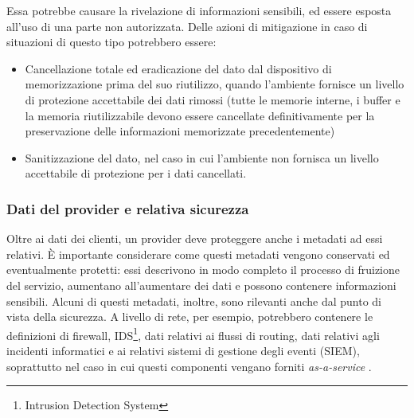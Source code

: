 \documentclass[../main.tex]{subfiles}
\begin{document}
Essa potrebbe causare la rivelazione di informazioni sensibili, ed essere esposta all'uso di una parte non autorizzata.
Delle azioni di mitigazione in caso di situazioni di questo tipo potrebbero essere:
\begin{itemize}
\item Cancellazione totale ed eradicazione del dato dal dispositivo di memorizzazione prima del suo riutilizzo, quando l'ambiente fornisce un livello di protezione accettabile dei dati rimossi (tutte le memorie interne, i buffer e la memoria riutilizzabile devono essere cancellate definitivamente per la preservazione delle informazioni memorizzate precedentemente)
\item Sanitizzazione del dato, nel caso in cui l'ambiente non fornisca un livello accettabile di protezione per i dati cancellati.
\end{itemize}
\subsubsection{Dati del provider e relativa sicurezza}
Oltre ai dati dei clienti, un provider deve proteggere anche i metadati ad essi relativi. \`E importante considerare come questi metadati vengono conservati ed eventualmente protetti: essi descrivono in modo completo il processo di fruizione del servizio, aumentano all'aumentare dei dati e possono contenere informazioni sensibili.
Alcuni di questi metadati, inoltre, sono rilevanti anche dal punto di vista della sicurezza. A livello di rete, per esempio, potrebbero contenere le definizioni di firewall, IDS\footnote{Intrusion Detection System}, dati relativi ai flussi di routing, dati relativi agli incidenti informatici e ai relativi sistemi di gestione degli eventi (SIEM), soprattutto nel caso in cui questi componenti vengano forniti \textit{as-a-service} \cite{CloudSecurityBook}.
\end{document}

